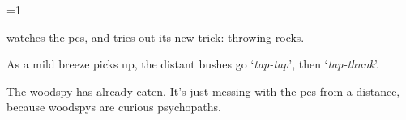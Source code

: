 \ifnum\value{temperature}=1
\woodspy

 watches the \glspl{pc}, and tries out its new trick: throwing rocks.

\begin{boxtext}
  As a mild breeze picks up, the distant bushes go `\textit{tap-tap}', then `\textit{tap-thunk}'.
\end{boxtext}

The \gls{woodspy} has already eaten.
It's just messing with the \glspl{pc} from a distance, because \glspl{woodspy} are curious psychopaths.

\fi
